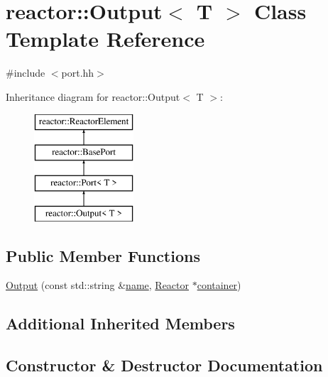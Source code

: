 \hypertarget{classreactor_1_1Output}{}\section{reactor\+:\+:Output$<$ T $>$ Class Template Reference}
\label{classreactor_1_1Output}


{\ttfamily \#include $<$port.\+hh$>$}

Inheritance diagram for reactor\+:\+:Output$<$ T $>$\+:\begin{figure}[H]
\begin{center}
\leavevmode
\includegraphics[height=4.000000cm]{classreactor_1_1Output}
\end{center}
\end{figure}
\subsection*{Public Member Functions}
\begin{DoxyCompactItemize}
\item 
\hyperlink{classreactor_1_1Output_a82e2c12d69313c406bf2e0e710295670}{Output} (const std\+::string \&\hyperlink{classreactor_1_1ReactorElement_a99579f61dbaf5d5d98aebfe26eb8bf77}{name}, \hyperlink{classreactor_1_1Reactor}{Reactor} $\ast$\hyperlink{classreactor_1_1ReactorElement_a25bf298de879a82eefc1ba426be05812}{container})
\end{DoxyCompactItemize}
\subsection*{Additional Inherited Members}


\subsection{Constructor \& Destructor Documentation}
\mbox{\label{classreactor_1_1Output_a82e2c12d69313c406bf2e0e710295670}} 
